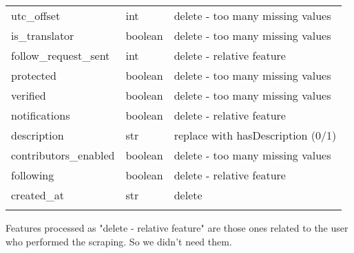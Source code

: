 \begin{center}
\begin{tabular}{lll}
		utc\_offset&int&delete - too many missing values\\
		is\_translator&boolean&delete - too many missing values\\
		follow\_request\_sent&int&delete - relative feature\\
		protected&boolean&delete - too many missing values\\
		verified&boolean&delete - too many missing values\\
		notifications&boolean&delete - relative feature\\
		description&str&replace with hasDescription (0/1)\\
		contributors\_enabled&boolean&delete - too many missing values\\
		following&boolean&delete - relative feature\\
		created\_at&str&delete\\\hline\\
	\end{tabular}
\end{center}
\normalsize
Features processed as "delete - relative feature" are those ones related to the user who performed the scraping. So we didn't need them.

